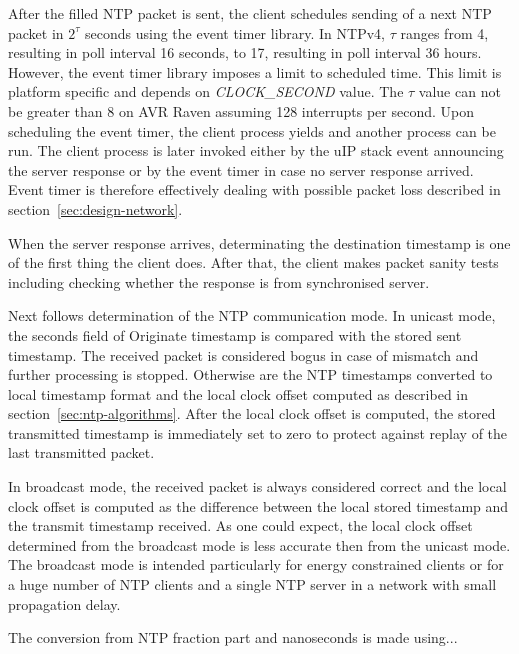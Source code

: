 After the filled NTP packet is sent, the client schedules
sending of a next NTP packet in $2^{\tau}$ seconds
using the event timer library.
In NTPv4, $\tau$ ranges from 4, resulting in poll interval 16 seconds,
to 17, resulting in poll interval 36 hours.
However, the event timer library imposes a limit to scheduled time.
This limit is platform specific and depends on {\it{CLOCK\_SECOND}} value.
The $\tau$ value can not be greater than 8 on AVR Raven assuming 128 interrupts per second.
Upon scheduling the event timer, the client process yields
and another process can be run.
The client process is later invoked either by the uIP stack event
announcing the server response
or by the event timer in case no server response arrived.
Event timer is therefore effectively
dealing with possible packet loss described in section~\ref{sec:design-network}.

When the server response arrives,
determinating the destination timestamp is one of the first thing the client does.
After that, the client makes packet sanity tests including
checking whether the response is from synchronised server.

Next follows determination of the NTP communication mode.
In unicast mode, the seconds field of Originate timestamp
is compared with the stored sent timestamp.
The received packet is considered bogus in case of mismatch and further processing is stopped.
Otherwise are the NTP timestamps converted to local timestamp format and
the local clock offset computed as described in section~\ref{sec:ntp-algorithms}.
After the local clock offset is computed,
the stored transmitted timestamp is immediately set to zero
to protect against replay of the last transmitted packet.

In broadcast mode, the received packet is always considered correct
and the local clock offset is computed as the difference between the local stored timestamp
and the transmit timestamp received.
As one could expect, the local clock offset determined from the broadcast mode
is less accurate then from the unicast mode.
The broadcast mode is intended particularly for energy constrained clients
or for a huge number of NTP clients and a single NTP server
in a network with small propagation delay.

The conversion from NTP fraction part and nanoseconds is made using...

